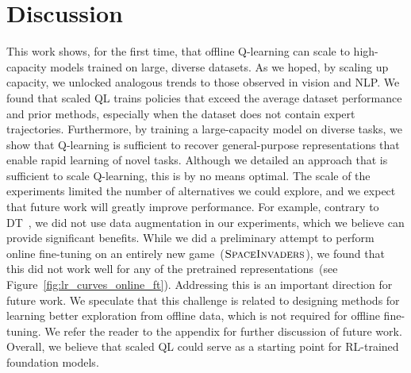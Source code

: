 \vspace{-0.2cm}
\section{Discussion}
\label{sec:discussion}
\vspace{-0.2cm}

This work shows, for the first time, that offline Q-learning can scale to high-capacity models trained on large, diverse datasets. As we hoped, by scaling up capacity, we unlocked analogous trends to those observed in vision and NLP. We found that scaled QL trains policies that exceed the average dataset performance and prior methods, especially when the dataset does not contain expert trajectories. Furthermore, by training a large-capacity model on diverse tasks, we show that Q-learning is sufficient to recover general-purpose representations that enable rapid learning of novel tasks. Although we detailed an approach that is sufficient to scale Q-learning, this is by no means optimal. The scale of the experiments limited the number of alternatives we could explore, and we expect that future work will greatly improve performance. %
For example, contrary to DT~\citep{lee2022multi}, we did not use data augmentation in our experiments, which we believe can provide significant benefits. While we did a preliminary attempt to perform online fine-tuning on an entirely new game~($\textsc{SpaceInvaders}$), we found that this did not work well for any of the pretrained representations~(see Figure~\ref{fig:lr_curves_online_ft}). Addressing this is an important direction for future work. We speculate that this challenge is related to designing methods for learning better exploration from offline data, which is not required for offline fine-tuning. We refer the reader to the appendix for further discussion of future work. Overall, we believe that scaled QL could serve as a starting point for RL-trained foundation models.



